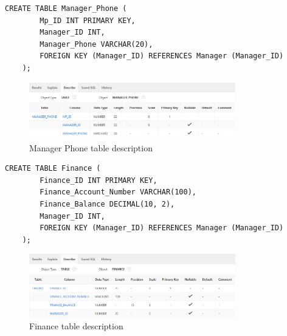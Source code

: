 \begin{lstlisting}[caption={Create Manager Phone table}, label={lst:create_manager_phone}]
    CREATE TABLE Manager_Phone (
        Mp_ID INT PRIMARY KEY,
        Manager_ID INT,
        Manager_Phone VARCHAR(20),
        FOREIGN KEY (Manager_ID) REFERENCES Manager (Manager_ID)
    );
    \end{lstlisting}

\begin{figure}[h]
    \centering
    \includegraphics[width=0.8\textwidth]{images/TableDesc/MANAGER_PHONE.png}
    \caption{Manager Phone table description}
    \label{fig:manger_phone_table}
\end{figure}

\begin{lstlisting}[caption={Create Finance table}, label={lst:create_finance}]
    CREATE TABLE Finance (
        Finance_ID INT PRIMARY KEY,
        Finance_Account_Number VARCHAR(100),
        Finance_Balance DECIMAL(10, 2),
        Manager_ID INT,
        FOREIGN KEY (Manager_ID) REFERENCES Manager (Manager_ID)
    );
    \end{lstlisting}

\begin{figure}[h]
    \centering
    \includegraphics[width=0.8\textwidth]{images/TableDesc/FINANCE.png}
    \caption{Finance table description}
    \label{fig:finance_table}
\end{figure}

